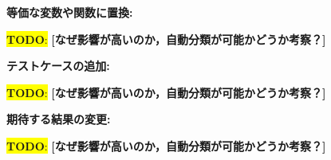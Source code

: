 \documentclass[uplatex,dvipdfmx,a4paper,twocolumn,base=11pt,jbase=11pt,ja=standard]{bxjsarticle}  %
\newcommand{\todo}[1]{\colorbox{yellow}{{\bf TODO}:}{\color{red} {\textbf{[#1]}}}}
\begin{document}
\noindent\textbf{等価な変数や関数に置換: }

\todo{なぜ影響が高いのか，自動分類が可能かどうか考察？}

\noindent\textbf{テストケースの追加: }

\todo{なぜ影響が高いのか，自動分類が可能かどうか考察？}

\noindent\textbf{期待する結果の変更: }

\todo{なぜ影響が高いのか，自動分類が可能かどうか考察？}



\begin{table*}[t]
  \caption{ライブラリテスト変更パターンの分類}
  \label{table_test_patern}
  \centering

\end{table*}

\end{document}
